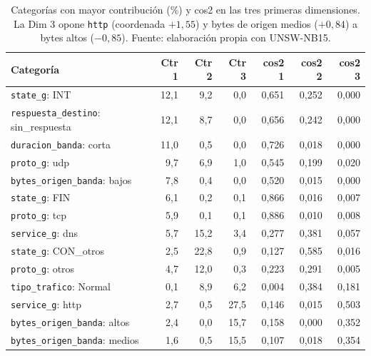 \begin{table}[htbp]
  \centering
  \caption[Contribuciones y cos2 de las categorías del ACM]{Categorías con mayor contribución (\%) y cos2 en las tres primeras dimensiones. La Dim 3 opone \texttt{http} (coordenada $+1{,}55$) y bytes de origen medios ($+0{,}84$) a bytes altos ($-0{,}85$). Fuente: elaboración propia con UNSW-NB15.}\label{tab:a-acm-contrib}
  \begin{tablacompacta}
  \begin{tabular}{lrrrrrr}
    \toprule
    Categoría & Ctr 1 & Ctr 2 & Ctr 3 & cos2 1 & cos2 2 & cos2 3 \\
    \midrule
    \texttt{state\_g}: INT & 12,1 & 9,2 & 0,0 & 0,651 & 0,252 & 0,000 \\
    \texttt{respuesta\_destino}: sin\_respuesta & 12,1 & 8,7 & 0,0 & 0,656 & 0,242 & 0,000 \\
    \texttt{duracion\_banda}: corta & 11,0 & 0,5 & 0,0 & 0,726 & 0,018 & 0,000 \\
    \texttt{proto\_g}: udp & 9,7 & 6,9 & 1,0 & 0,545 & 0,199 & 0,020 \\
    \texttt{bytes\_origen\_banda}: bajos & 7,8 & 0,4 & 0,0 & 0,520 & 0,015 & 0,000 \\
    \texttt{state\_g}: FIN & 6,1 & 0,2 & 0,1 & 0,866 & 0,016 & 0,007 \\
    \texttt{proto\_g}: tcp & 5,9 & 0,1 & 0,1 & 0,886 & 0,010 & 0,008 \\
    \texttt{service\_g}: dns & 5,7 & 15,2 & 3,4 & 0,277 & 0,381 & 0,057 \\
    \texttt{state\_g}: CON\_otros & 2,5 & 22,8 & 0,9 & 0,127 & 0,585 & 0,016 \\
    \texttt{proto\_g}: otros & 4,7 & 12,0 & 0,3 & 0,223 & 0,291 & 0,005 \\
    \texttt{tipo\_trafico}: Normal & 0,1 & 8,9 & 6,2 & 0,004 & 0,384 & 0,181 \\
    \texttt{service\_g}: http & 2,7 & 0,5 & 27,5 & 0,146 & 0,015 & 0,503 \\
    \texttt{bytes\_origen\_banda}: altos & 2,4 & 0,0 & 15,7 & 0,158 & 0,000 & 0,352 \\
    \texttt{bytes\_origen\_banda}: medios & 1,6 & 0,5 & 15,5 & 0,107 & 0,018 & 0,354 \\
    \bottomrule
  \end{tabular}
  \end{tablacompacta}
\end{table}

